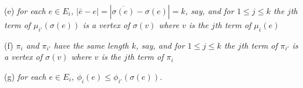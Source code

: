 \hspace*{12pt}(e) \textit{for each $e \in E_i$, $|\bar{e} - e| = |\overline{\sigma(e)} - \sigma(e)| = k$, say, and for $1 \le j \le k$ the $j$th term of $\mu_{i'}(\sigma(e))$ is a vertex of $\sigma(v)$ where $v$ is the $j$th term of $\mu_i(e)$}

\hspace*{12pt}(f) \textit{$\pi_i$ and $\pi_{i'}$ have the same length $k$, say, and for $1 \le j \le k$ the $j$th term of $\pi_{i'}$ is a vertex of $\sigma(v)$ where $v$ is the $j$th term of $\pi_i$}

\hspace*{12pt}(g) \textit{for each $e \in E_i$, $\phi_i(e) \le \phi_{i'}(\sigma(e))$.}
